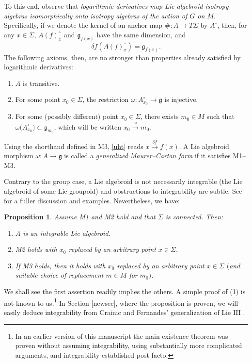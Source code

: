\documentclass[10pt,a4paper]{amsart}
\numberwithin{equation}{section}
\newtheorem{Proposition}[Theorem]{Proposition}
\begin{document}
To this end, observe that {\it logarithmic derivatives map Lie
algebroid isotropy algebras isomorphically onto isotropy algebras of
the action of $G$ on $M$}. Specifically, if we denote the kernel of an
anchor map $\#\colon A \rightarrow T \Sigma$ by $A^\circ $, then, for
any $x \in \Sigma$, $A(f )_x^\circ$ and ${\mathfrak g}_{f(x)}$ have the
same dimension, and
\begin{equation}
\delta f(A(f)_x^\circ) = {\mathfrak g}_{f(x)}.
 \label{uht}
\end{equation}
The following axioms, then, are no stronger than
properties already satisfied by logarithmic derivatives:
\begin{enumerate}\itemsep=0pt
\item[M1] $A$ is transitive.
\item[M2] For some point $x_0 \in \Sigma $, the restriction
$\omega \colon A^\circ_{x_0} \rightarrow {\mathfrak g}$ is injective.
\item[M3] For some (possibly different) point $x_0 \in \Sigma $,
there exists $m_0 \in M$ such that $\omega\big(A^\circ_{x_0}\big) \subset
{\mathfrak g}_{m_0}$, which will be written $x_0\xrightarrow{\omega}m_0$.
\end{enumerate}
%
Using the shorthand defined in M3, \eqref{uht} reads $x
\xrightarrow{\delta f} f(x)$. A Lie algebroid morphism $\omega \colon
A \rightarrow {\mathfrak g}$ is called a {\it generalized
Maurer--Cartan form} if it satisfies M1--M3.

Contrary to the group case, a Lie algebroid is not necessarily
integrable (the Lie algebroid of some Lie groupoid) and obstructions
to integrability are subtle. See \cite{Crainic_Fernandes_11} for a
fuller discussion and examples. Nevertheless, we have:
\begin{Proposition}\label{frogP}
Assume {\normalfont M1} and {\normalfont M2} hold
and that $\Sigma$ is connected. Then:
 \begin{enumerate}\itemsep=0pt
 \item[$1.$] $A$ is an integrable Lie algebroid.%
 \item[$2.$] {\normalfont M2} holds with $x_0$ replaced by an arbitrary
point $x \in \Sigma $.%
 \item[$3.$] If {\normalfont M3} holds, then it holds with $x_0$
replaced by an arbitrary point $x \in \Sigma $ $($and suitable choice of
replacement $m \in M$ for $m_0)$.%
 \end{enumerate}
\end{Proposition}
%
We shall see the first assertion readily implies the others. A simple
proof of (1) is not known to us.\footnote{In an earlier
 version of this manuscript the main existence theorem was proven
 without assuming integrability, using substantially more complicated
 arguments, and integrability established post facto.} In Section
\ref{newsec}, where the proposition is proven, we will easily deduce
integrability from Crainic and Fernandes' generalization of Lie III
\cite{Crainic_Fernandes_03}.
\end{document}
